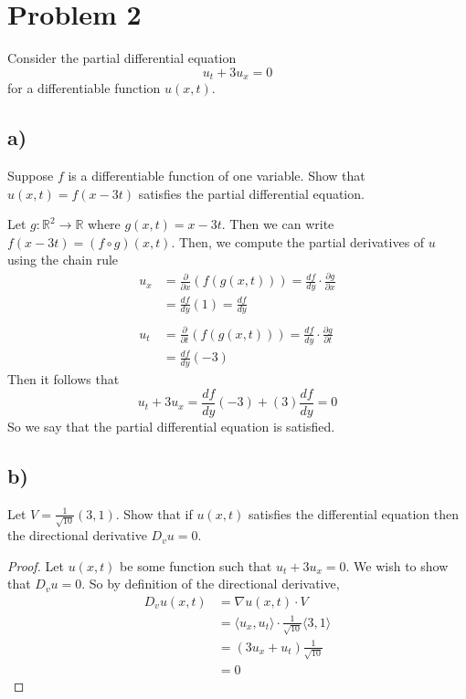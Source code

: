 \documentclass{article}
\theoremstyle{definition}
\begin{document}
\section*{Problem 2}
    Consider the partial differential equation
    \[
        u_t + 3u_x = 0
    \]
    for a differentiable function $u(x,t)$.
    \subsection*{a)}
        \begin{mdframed}
            Suppose $f$ is a differentiable function of one variable. Show that $u(x,t) = f(x - 3t)$ satisfies the 
            partial differential equation.
        \end{mdframed}
        Let $g : \mathbb{R}^2 \rightarrow \mathbb{R}$ where $g(x,t) = x - 3t$. Then we can write $f(x-3t) = (f \circ g)(x,t)$.
        Then, we compute the partial derivatives of $u$ using the chain rule
        \begin{align*}
            u_x &= \frac{\partial}{\partial x}(f(g(x,t))) = \frac{df}{dy} \cdot \frac{\partial g}{\partial x}\\
            &= \frac{df}{dy}(1) = \frac{df}{dy} \\\\
            u_t &= \frac{\partial}{\partial t}(f(g(x,t))) = \frac{df}{dy} \cdot \frac{\partial g}{\partial t}\\
            &=  \frac{df}{dy}(-3)
        \end{align*}
        Then it follows that 
        \[
            u_t + 3u_x = \frac{df}{dy}(-3) + (3) \frac{df}{dy} = 0
        \]
        So we say that the partial differential equation is satisfied.
    \subsection*{b)}
        \begin{mdframed}
            Let $V = \frac{1}{\sqrt{10}}(3,1)$. Show that if $u(x,t)$ satisfies the differential equation then 
            the directional derivative $D_v u = 0$.
        \end{mdframed}
        \begin{proof}
            Let $u(x,t)$ be some function such that $u_t + 3u_x = 0$.
            We wish to show that $D_v u = 0$.
            So by definition of the directional derivative,
            \begin{align*}
                D_v u(x,t) &= \nabla u(x,t) \cdot V \\
                &= \langle u_x, u_t \rangle \cdot \frac{1}{\sqrt{10}}\langle 3,1\rangle \\
                &= (3u_x + u_t)\frac{1}{\sqrt{10}} \\
                &= 0
            \end{align*}
        \end{proof}
\end{document}
